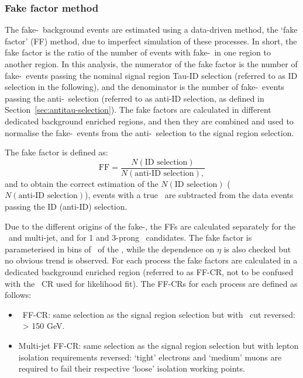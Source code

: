 \subsubsection{Fake factor method}
The fake-\tauhad\ background events
are estimated using a data-driven method, the `fake factor' (FF) method, 
due to imperfect simulation of these processes.
In short, the fake factor is the ratio of 
the number of events with fake-\tauhad\ in one region to another region.
In this analysis, 
the numerator of the fake factor is the number of fake-\tauhad\ events 
passing the nominal signal region Tau-ID selection 
(referred to as ID selection in the following), 
and the denominator is the number of fake-\tauhad\ events passing the
anti-\tauhad\ selection (referred to as anti-ID selection, 
as defined in Section~\ref{sec:antitau-selection}). 
The fake factors are calculated in different dedicated background enriched regions, 
and then they are combined and used to normalise the fake-\tauhad\ events from the 
anti-\tauhad\ selection to the signal region selection. 

The fake factor is defined as:
\begin{equation}
\mathrm{FF} =  \frac{N(\text{ID\ selection})}{N(\text{anti-ID\ selection}),} 
\end{equation} 
and to obtain the correct estimation of the 
$N(\text{ID\ selection})$ ($N(\text{anti-ID\ selection})$),
events with a true \tauhad\ are subtracted from the data events
passing the ID (anti-ID) selection.

Due to the different origins of the fake-\tauhad, the FFs are
calculated separately for the \ttbar\ and multi-jet, 
and for 1 and 3-prong \tauhad\ candidates.
The fake factor is parameterised in bins of \pt\ of the \tauhad, while the 
dependence on $\eta$ is also checked but no obvious trend is observed.
For each process the fake factors are calculated in 
a dedicated background enriched region (referred to as FF-CR,
not to be confused with the \ZHF\ CR used for likelihood fit). 
The FF-CRs for each process are defined as follows:
\begin{itemize}
\item \ttbar\ FF-CR: same selection as the signal region selection 
but with \mbb\ cut reversed: \mbb\ > 150 GeV.
\item Multi-jet FF-CR: same selection as the signal region selection but with 
lepton isolation requirements reversed: `tight' electrons and `medium' muons 
are required to fail their respective `loose' isolation working points.
\end{itemize}

